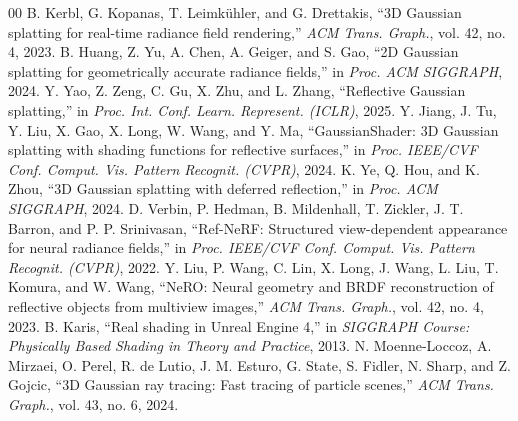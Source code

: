 \documentclass[conference]{IEEEtran}
\begin{document}
\begin{thebibliography}{00}
 B. Kerbl, G. Kopanas, T. Leimkühler, and G. Drettakis, ``3D Gaussian splatting for real-time radiance field rendering,'' \textit{ACM Trans. Graph.}, vol. 42, no. 4, 2023.
 B. Huang, Z. Yu, A. Chen, A. Geiger, and S. Gao, ``2D Gaussian splatting for geometrically accurate radiance fields,'' in \textit{Proc. ACM SIGGRAPH}, 2024.
 Y. Yao, Z. Zeng, C. Gu, X. Zhu, and L. Zhang, ``Reflective Gaussian splatting,'' in \textit{Proc. Int. Conf. Learn. Represent. (ICLR)}, 2025.
 Y. Jiang, J. Tu, Y. Liu, X. Gao, X. Long, W. Wang, and Y. Ma, ``GaussianShader: 3D Gaussian splatting with shading functions for reflective surfaces,'' in \textit{Proc. IEEE/CVF Conf. Comput. Vis. Pattern Recognit. (CVPR)}, 2024.
 K. Ye, Q. Hou, and K. Zhou, ``3D Gaussian splatting with deferred reflection,'' in \textit{Proc. ACM SIGGRAPH}, 2024.
 D. Verbin, P. Hedman, B. Mildenhall, T. Zickler, J. T. Barron, and P. P. Srinivasan, ``Ref-NeRF: Structured view-dependent appearance for neural radiance fields,'' in \textit{Proc. IEEE/CVF Conf. Comput. Vis. Pattern Recognit. (CVPR)}, 2022.
 Y. Liu, P. Wang, C. Lin, X. Long, J. Wang, L. Liu, T. Komura, and W. Wang, ``NeRO: Neural geometry and BRDF reconstruction of reflective objects from multiview images,'' \textit{ACM Trans. Graph.}, vol. 42, no. 4, 2023.
 B. Karis, ``Real shading in Unreal Engine 4,'' in \textit{SIGGRAPH Course: Physically Based Shading in Theory and Practice}, 2013.
 N. Moenne-Loccoz, A. Mirzaei, O. Perel, R. de Lutio, J. M. Esturo, G. State, S. Fidler, N. Sharp, and Z. Gojcic, ``3D Gaussian ray tracing: Fast tracing of particle scenes,'' \textit{ACM Trans. Graph.}, vol. 43, no. 6, 2024.
\end{thebibliography}
\end{document}
